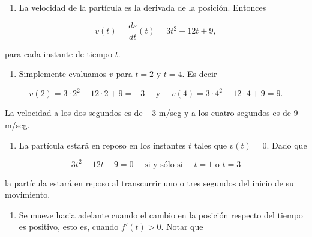\documentclass[
  letterpaper,
]{book}
\providecommand{\tightlist}{%
  \setlength{\itemsep}{0pt}\setlength{\parskip}{0pt}}
\theoremstyle{plain}
\theoremstyle{remark}
\begin{document}
\begin{tcolorbox}[enhanced jigsaw, opacityback=0, left=2mm, opacitybacktitle=0.6, toprule=.15mm, bottomrule=.15mm, colbacktitle=quarto-callout-tip-color!10!white, titlerule=0mm, bottomtitle=1mm, title=\textcolor{quarto-callout-tip-color}{\faLightbulb}\hspace{0.5em}{Solución}, toptitle=1mm, colframe=quarto-callout-tip-color-frame, colback=white, breakable, rightrule=.15mm, arc=.35mm, leftrule=.75mm, coltitle=black]

\begin{enumerate}
\def\labelenumi{\arabic{enumi}.}
\tightlist
\item
  La velocidad de la partícula es la derivada de la posición. Entonces
\end{enumerate}

\[
v(t)=\frac{ds}{dt}(t)=3t^2-12t+9,
\]

para cada instante de tiempo \(t\).

\begin{enumerate}
\def\labelenumi{\arabic{enumi}.}
\setcounter{enumi}{1}
\tightlist
\item
  Simplemente evaluamos \(v\) para \(t=2\) y \(t=4\). Es decir
\end{enumerate}

\[
v(2)=3\cdot 2^2-12\cdot 2+9=-3 \quad \text{ y }\quad v(4)=3\cdot 4^2-12\cdot 4+9=9.
\]

La velocidad a los dos segundos es de \(-3\) m/seg y a los cuatro
segundos es de \(9\) m/seg.

\begin{enumerate}
\def\labelenumi{\arabic{enumi}.}
\setcounter{enumi}{2}
\tightlist
\item
  La partícula estará en reposo en los instantes \(t\) tales que
  \(v(t)=0\). Dado que
\end{enumerate}

\[
3t^2-12t+9=0 \quad \text{ si y sólo si }\quad t=1 \text{ o }  t=3 
\]

la partícula estará en reposo al transcurrir uno o tres segundos del
inicio de su movimiento.

\begin{enumerate}
\def\labelenumi{\arabic{enumi}.}
\setcounter{enumi}{3}
\tightlist
\item
  Se mueve hacia adelante cuando el cambio en la posición respecto del
  tiempo es positivo, esto es, cuando \(f'(t)>0\). Notar que
\end{enumerate}


\end{tcolorbox}
\end{document}
